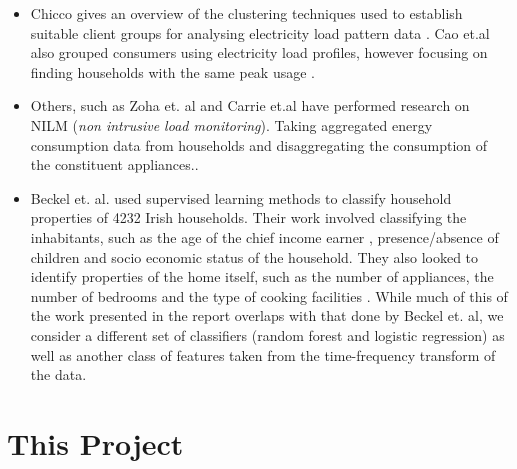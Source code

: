 \begin{itemize}
\item Chicco gives an overview of the clustering techniques used to establish suitable client groups for analysing electricity load pattern data \cite{Chicco}. Cao et.al also grouped consumers using electricity load profiles, however focusing on finding households with the same peak usage \cite{Cao}. 
\item Others, such as Zoha et. al and Carrie et.al have performed research on NILM (\textit{non intrusive load monitoring}). Taking aggregated energy consumption data from households and disaggregating the consumption of the constituent appliances.\cite{Zoha}\cite{Carrie}. 
 
\item Beckel et. al. used supervised learning methods to classify household properties of 4232 Irish households. Their work involved classifying the inhabitants, such as the age of the chief income earner , presence/absence of children and socio economic status of the household. They also looked to identify properties of the home itself, such as the number of appliances, the number of bedrooms and the type of cooking facilities \cite{Beckel_3}. While much of this of the work presented in the report overlaps with that done by Beckel et. al, we consider a different set of classifiers (random forest and logistic regression) as well as another class of features taken from the time-frequency transform of the data.
\end{itemize}


\section{This Project}

